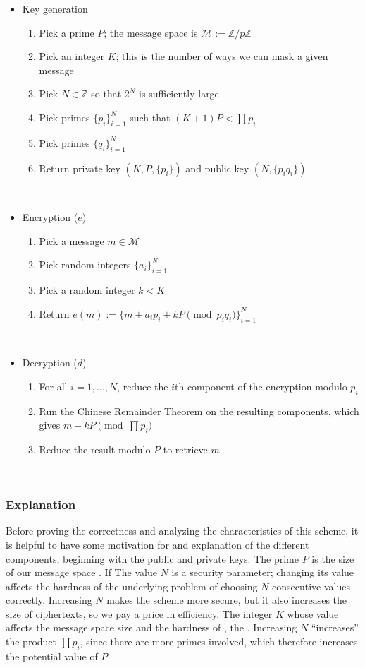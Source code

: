 \documentclass[11pt]{report}
\newcommand{\Z}{\mathbb{Z}}
\newcommand{\M}{\mathcal{M}}
\newcommand{\Zp}{\mathbb{Z}/p\mathbb{Z}}
\begin{document}
\begin{itemize}
\item Key generation
\begin{enumerate}
\item Pick a prime $P$; the message space is $\M := \Zp$
\item Pick an integer $K$; this is the number of ways we can mask a given message
\item Pick $N\in \Z$ so that $2^N$ is sufficiently large
\item Pick primes $\{p_i\}_{i=1}^N$ such that $(K+1)P<\prod p_i$
\item Pick primes $\{q_i\}_{i=1}^N$
\item Return private key $(K,P,\{p_i\})$ and public key $(N,\{p_iq_i\})$
\end{enumerate}

\

\item Encryption ($e$)
\begin{enumerate}
\item Pick a message $m\in \M$
\item Pick random integers $\{a_i\}_{i=1}^N$
\item Pick a random integer $k<K$
\item Return $e(m):=\{m+a_ip_i+kP \pmod{p_iq_i}\}_{i=1}^N$
\end{enumerate}

\

\item Decryption ($d$)
\begin{enumerate}
\item For all $i=1,\ldots,N$, reduce the $i$th component of the encryption modulo $p_i$
\item Run the Chinese Remainder Theorem on the resulting components, which gives $m+kP \pmod{\prod p_i}$
\item Reduce the result modulo $P$ to retrieve $m$
\end{enumerate}
\end{itemize}

\

\subsubsection{Explanation}

Before proving the correctness and analyzing the characteristics of this scheme, it is helpful to have some motivation for and explanation of the different components, beginning with the public and private keys. The prime $P$ is the size of our message space . If The value $N$ is a security parameter; changing its value affects the hardness of the underlying problem of choosing $N$ consecutive values correctly. Increasing $N$ makes the scheme more secure, but it also increases the size of ciphertexts, so we pay a price in efficiency. The integer $K$   whose value affects the message space size and the hardness of , the . Increasing $N$ ``increases'' the product $\prod p_i$, since there are more primes involved, which therefore increases the potential value of $P$
\end{document}
